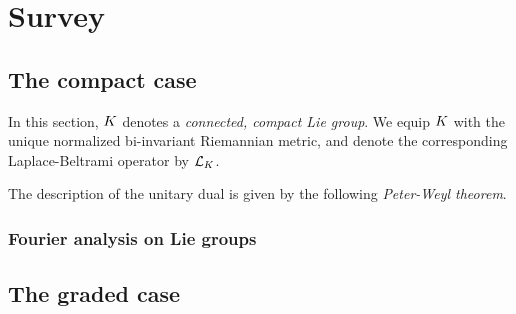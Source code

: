 \chapter{Survey}

\section{The compact case}

In this section,
$\CompactGroup$ denotes a \emph{connected, compact Lie group}.
We equip $\CompactGroup$ with the unique normalized bi-invariant Riemannian metric,
and denote the corresponding Laplace-Beltrami operator by $\Laplacian [\CompactGroup]$.

The description of the unitary dual is given by the following \emph{Peter-Weyl theorem}.

\subsection{Fourier analysis on Lie groups}

\section{The graded case}
